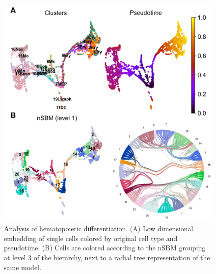\documentclass[11pt, titlepage, twoside]{article}
\begin{document}
\begin{figure}[htbp]
\centering
\includegraphics[keepaspectratio,width=\textwidth,height=0.75\textheight]{Figure_Hemato_Supp.png}
\caption[]{Analysis of hematopoietic differentiation. (A) Low dimensional embedding of single cells colored by original cell type and pseudotime. (B) Cells are colored according to the nSBM grouping at level 3 of the hierarchy, next to a radial tree representation of the same model.}\label{Figure_Hemato_Supp}
\end{figure}
\clearpage
\end{document}
